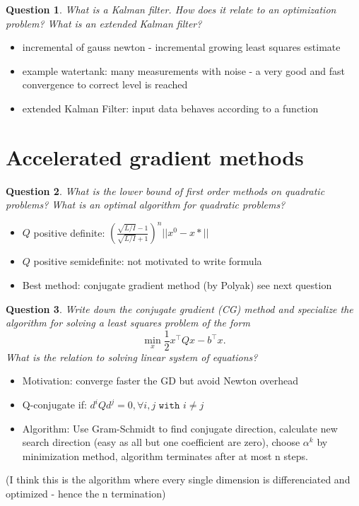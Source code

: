 \documentclass{article}
\newtheorem{question}{Question}
\newcommand{\T}[1]{#1^{\top}}
\begin{document}
\begin{question}
  What is a Kalman filter. How does it relate to an optimization problem?  What is an extended
  Kalman filter?
\end{question}
\begin{itemize}
\item incremental of gauss newton - incremental growing least squares estimate
\item example watertank: many measurements with noise - a very good and fast convergence to correct
  level is reached
\item extended Kalman Filter: input data behaves according to a function
\end{itemize}

\section{Accelerated gradient methods}

\begin{question}
  What is the lower bound of first order methods on quadratic problems?  What is an optimal
  algorithm for quadratic problems?
\end{question}
\begin{itemize}
\item $Q$ positive definite: $\left(\frac{\sqrt{L/I}-1}{\sqrt{L/I} + 1}\right)^n || x^0  - x* ||$
\item $Q$ positive semidefinite: not motivated to write formula
\item Best method: conjugate gradient method (by Polyak) see next question
\end{itemize}

\begin{question}
  Write down the conjugate gradient (CG) method and specialize the algorithm for solving a least
  squares problem of the form
  \[
    \min_x \frac{1}{2} \T{x} Q x - \T{b} x.
  \]
  What is the relation to solving linear system of equations?
\end{question}
\begin{itemize}
\item Motivation: converge faster the GD but avoid Newton overhead
\item Q-conjugate if: $d^i  Q d^j = 0, \forall i, j \texttt{ with } i \neq j$
\item Algorithm: Use Gram-Schmidt to find conjugate direction, calculate new search direction (easy
  as all but one coefficient are zero), choose $\alpha^k$ by minimization method, algorithm
  terminates after at most n steps.
\end{itemize}
(I think this is the algorithm where every single dimension is differenciated and optimized - hence
the n termination)
\end{document}

